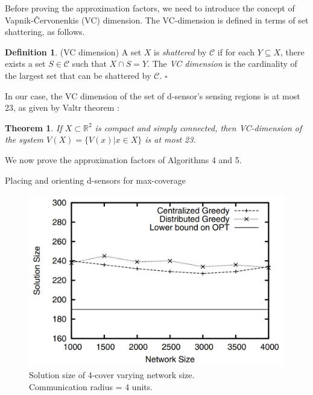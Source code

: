 \documentclass[conference]{IEEEtran}
\newtheorem{theorem}{Theorem}
\theoremstyle{definition}
\newtheorem{definition}{Definition}
\newtheorem*{NP-Hardness of Approximating the SODkC Problem}{NP-Hardness of Approximating the SODkC Problem}
\newtheorem*{Greedy Algorithm (GA)}{Greedy Algorithm (GA)}
\newtheorem*{GA on the Running Example}{GA on the Running Example}
\newtheorem*{Performance Guarantee of GA}{Performance Guarantee of GA}
\begin{document}
Before proving the approximation factors, we need to introduce the concept of Vapnik-\v{C}ervonenkis (VC) dimension. The VC-dimension is defined in terms of set shattering, as follows.

\begin{definition}
(VC dimension) A set $X$ is \textit{shattered} by $\mathcal{C}$ if for each $Y \subseteq X$, there exists a set $S \in \mathcal{C}$ such that $X \cap S = Y$. The \textit{VC dimension} is the cardinality of the
largest set that can be shattered by $\mathcal{C}$. \hfill $\square$
\end{definition}

In our case, the VC dimension of the set of d-sensor’s sensing regions is at most 23, as given by Valtr theorem \cite{Valtr1998GuardingGW}:

\begin{theorem}
If $X \subset \mathbb{R}^2$ is compact and simply connected, then VC-dimension of the system $V(X) = \{V (x) | x \in X\}$ is at most 23.
\end{theorem}

We now prove the approximation factors of Algorithms 4 and 5.

\begin{algorithm}
    \caption{Placing and orienting d-sensors for max-coverage}
\end{algorithm}

\begin{figure}[t]
    \centering
    \includegraphics[width=0.7\columnwidth]{5.png}
    \caption{Solution size of 4-cover varying network size.\\ \indent Communication {radius = 4} units.}
    \label{fig:enter-label}
\end{figure}
\end{document}
